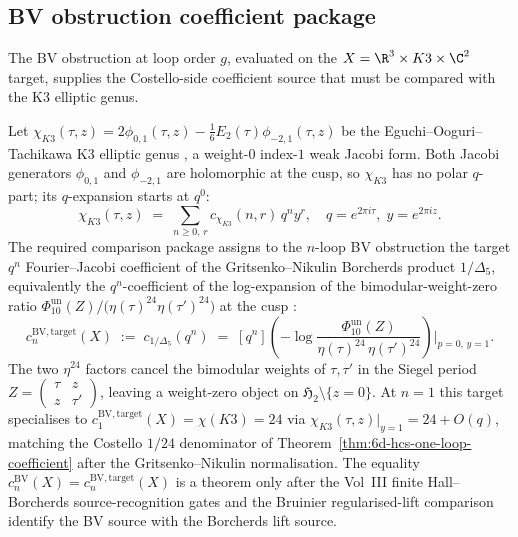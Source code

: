 \subsection{BV obstruction coefficient package}
\label{subsec:hcs-bv-obstruction}

The BV obstruction at loop order $g$, evaluated on the
$X = \R^{3}\times K3\times\C^{2}$ target, supplies the Costello-side
coefficient source that must be compared with the K3 elliptic genus.

\begin{proposition}
\label{prop:hcs-obstruction-jacobi}
Let $\chi_{K3}(\tau,z) = 2\phi_{0,1}(\tau,z) - \tfrac{1}{6}E_{2}(\tau)\phi_{-2,1}(\tau,z)$
be the Eguchi--Ooguri--Tachikawa K3 elliptic genus \cite{EOT11},
a weight-$0$ index-$1$ weak Jacobi form. Both Jacobi generators
$\phi_{0,1}$ and $\phi_{-2,1}$ are holomorphic at the cusp, so
$\chi_{K3}$ has no polar $q$-part; its $q$-expansion starts at $q^{0}$:
\[
 \chi_{K3}(\tau,z)
 \;=\;
 \sum_{n\ge 0,\,r}c_{\chi_{K3}}(n,r)\,q^{n}y^{r},
 \quad q = e^{2\pi i\tau},\; y = e^{2\pi i z}.
\]
The required comparison package assigns to the $n$-loop BV obstruction
the target $q^{n}$ Fourier--Jacobi coefficient of the
Gritsenko--Nikulin Borcherds product $1/\Delta_{5}$, equivalently the
$q^{n}$-coefficient of the log-expansion of the
bimodular-weight-zero ratio
$\Phi_{10}^{\mathrm{un}}(Z)/\bigl(\eta(\tau)^{24}\eta(\tau')^{24}\bigr)$ at the cusp
\cite[Thm.~2.1]{GritsenkoNikulin1998}:
\begin{equation}\label{eq:bv-obstruction-jacobi-matching}
 c_{n}^{\mathrm{BV,target}}(X)
 \;:=\;
 c_{1/\Delta_{5}}(q^{n})
 \;=\;
 [q^n]\!\left(-\log\frac{\Phi_{10}^{\mathrm{un}}(Z)}{\eta(\tau)^{24}\,\eta(\tau')^{24}}\right)\Big|_{p=0,\,y=1}.
\end{equation}
The two $\eta^{24}$ factors cancel the bimodular weights of $\tau,\tau'$
in the Siegel period $Z = \begin{pmatrix}\tau & z \\ z & \tau'\end{pmatrix}$,
leaving a weight-zero object on $\mathfrak H_{2}\setminus\{z = 0\}$.
At $n=1$ this target specialises to
$c_{1}^{\mathrm{BV,target}}(X) = \chi(K3) = 24$
via $\chi_{K3}(\tau,z)|_{y=1} = 24 + O(q)$, matching the Costello
$1/24$ denominator of Theorem~\ref{thm:6d-hcs-one-loop-coefficient}
after the Gritsenko--Nikulin normalisation.  The equality
$c_{n}^{\mathrm{BV}}(X)=c_{n}^{\mathrm{BV,target}}(X)$ is a theorem
only after the Vol~III finite Hall--Borcherds source-recognition gates
and the Bruinier regularised-lift comparison identify the BV source
with the Borcherds lift source.
\end{proposition}

